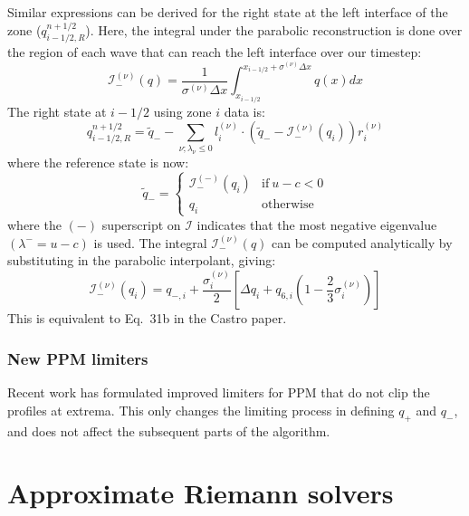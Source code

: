 Similar expressions can be derived for the right state at the left interface
of the zone ($q_{i-1/2,R}^{n+1/2}$).  Here, the integral under the parabolic
reconstruction is done over the region of each wave that can reach the left
interface over our timestep:
\begin{equation}
\mathcal{I}_-^{(\nu)}(q) = \frac{1}{\sigma^{(\nu)} \Delta x}
  \int_{x_{i-1/2}}^{x_{i-1/2} + \sigma^{(\nu)} \Delta x} q(x) dx
\end{equation}
The right state at $i-1/2$ using zone $i$ data is:
\begin{equation}
q_{i-1/2,R}^{n+1/2} = \tilde{q}_- - \sum_{\nu; \lambda_\nu \le 0}
   l_i^{(\nu)} \cdot \left ( \tilde{q}_- - \mathcal{I}_-^{(\nu)}(q_i) \right ) r_i^{(\nu)}
\end{equation}
where the reference state is now:
\begin{equation}
\tilde{q}_- = \left \{ \begin{array}{cc}
   \mathcal{I}_-^{(-)}(q_i) & \mathrm{if~} u - c < 0 \\
    q_i                   & \mathrm{otherwise}
\end{array} \right .
\end{equation}
where the $(-)$ superscript on $\mathcal{I}$ indicates that the most
negative eigenvalue $(\lambda^- = u - c)$ is used.  The integral
$\mathcal{I}_-^{(\nu)}(q)$ can be computed analytically by
substituting in the parabolic interpolant, giving:
\begin{equation}
\mathcal{I}_-^{(\nu)}(q_i) = q_{-,i} + \frac{\sigma_i^{(\nu)}}{2}
   \left [ \Delta q_i + q_{6,i} \left ( 1 - \frac{2}{3} \sigma_i^{(\nu)} \right ) \right ]
\end{equation}
This is equivalent to Eq.~31b in the Castro paper.

\subsubsection{New PPM limiters}

Recent work \cite{colellasekora} has formulated improved limiters for
PPM that do not clip the profiles at extrema.  This only changes the
limiting process in defining $q_+$ and $q_-$, and does not affect the
subsequent parts of the algorithm.





\section{Approximate Riemann solvers}


